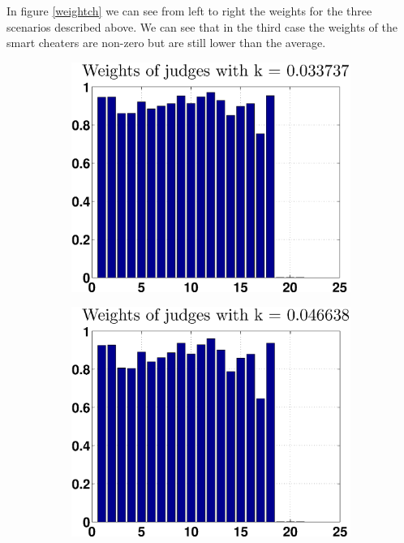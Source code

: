 \documentclass[12pt,a4paper]{article}
\begin{document}
In figure \ref{weightch} we can see from left to right the weights for the three scenarios described above. We can see that in the third case the weights of the smart cheaters are non-zero but are still lower than the average.

\begin{figure}[!ht]
\begin{subfigure}[b]{0.32\textwidth}
\includegraphics[width = \textwidth]{cheaters/chweightsStupid.eps}
\end{subfigure}
\begin{subfigure}[b]{0.32\textwidth}
\includegraphics[width = \textwidth]{cheaters/chweightsSmart.eps}

\end{subfigure}
\end{figure}
\end{document}
